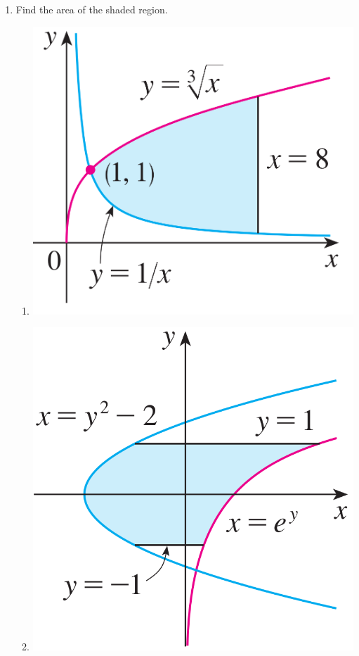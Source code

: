 \documentclass[12pt]{article}
\begin{document}
\begin{multicols*}{2}
\begin{enumerate}
		\item Find the area of the shaded region.
		\begin{enumerate}
			\item \includegraphics[scale=.2]{1.PNG}
			\vfill
			\item \includegraphics[scale=.25]{2.PNG}
		\end{enumerate}
		\vfill\null\columnbreak


\end{enumerate}
\end{multicols*}
\end{document}

